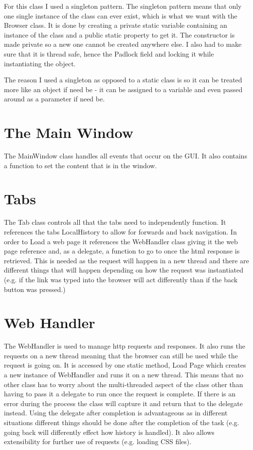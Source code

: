 \documentclass[11pt]{report}
\begin{document}
For this class I used a singleton pattern.  The singleton pattern means that only one single instance of the class can ever exist, which is what we want with the Browser class.  It is done by creating a private static variable containing an instance of the class and a public static property to get it.  The constructor is made private so a new one cannot be created anywhere else.  I also had to make sure that it is thread safe, hence the Padlock field and locking it while instantiating the object.

The reason I used a singleton as opposed to a static class is so it can be treated more like an object if need be - it can be assigned to a variable and even passed around as a parameter if need be.

\section{The Main Window}

The MainWindow class handles all events that occur on the GUI.  It also contains a function to set the content that is in the window.

\section{Tabs}

The Tab class controls all that the tabs need to independently function.  It references the tabs LocalHistory to allow for forwards and back navigation.  In order to Load a web page it references the WebHandler class giving it the web page reference and, as a delegate, a function to go to once the html response is retrieved.  This is needed as the request will happen in a new thread and there are different things that will happen depending on how the request was instantiated (e.g. if the link was typed into the browser will act differently than if the back button was pressed.)

\section{Web Handler}

The WebHandler is used to manage http requests and responses.  It also runs the requests on a new thread meaning that the browser can still be used while the request is going on.  It is accessed by one static method, Load Page which creates a new instance of WebHandler and runs it on a new thread.  This means that no other class has to worry about the multi-threaded aspect of the class other than having to pass it a delegate to run once the request is complete.  If there is an error during the process the class will capture it and return that to the delegate instead.  Using the delegate after completion is advantageous as in different situations different things should be done after the completion of the task (e.g. going back will differently effect how history is handled).  It also allows extensibility for further use of requests (e.g. loading CSS files).
\end{document}
